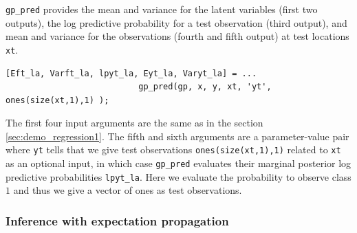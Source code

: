 \documentclass[twoside,11pt]{article}
\newcommand{\code}[1]{{\normalfont\texttt{#1}}}
\begin{document}
\code{gp\_pred} provides the mean and variance for the latent
variables (first two outputs), the log predictive probability for a
test observation (third output), and mean and variance for the
observations (fourth and fifth output) at test locations \code{xt}.
%
\begin{verbatim}
[Eft_la, Varft_la, lpyt_la, Eyt_la, Varyt_la] = ... 
                           gp_pred(gp, x, y, xt, 'yt', ones(size(xt,1),1) );
\end{verbatim}
%
The first four input arguments are the same as in the section
\ref{sec:demo_regression1}. The fifth and sixth arguments are a
parameter-value pair where \code{yt} tells that we give test
observations \code{ones(size(xt,1),1)} related to \code{xt} as an
optional input, in which case \code{gp\_pred} evaluates their marginal
posterior log predictive probabilities \code{lpyt\_la}. Here we evaluate
the probability to observe class $1$ and thus we give a vector of ones
as test observations. %


\subsubsection{Inference with expectation propagation}
\end{document}
